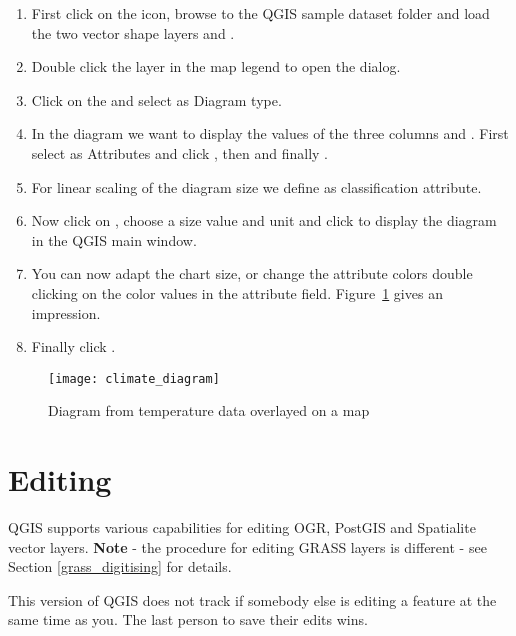 \begin{enumerate}
\item First click on the  icon,
browse to the QGIS sample dataset folder and load the two vector shape layers
 and .
\item Double click the  layer in the map legend to open the
 dialog.
\item Click on the  and select  as
Diagram type.
\item In the diagram we want to display the values of the three columns
 and . First select
 as Attributes and click , then
 and finally .  
\item For linear scaling of the diagram size we define 
as classification attribute.
\item Now click on , choose a size value and unit
and click  to display the diagram in the QGIS main window.
\item You can now adapt the chart size, or change the attribute colors double
clicking on the color values in the attribute field.
Figure~\ref{fig:climatediagram} gives an impression.
\item Finally click . 
\end{enumerate}

\begin{figure}[ht]
   \begin{center}
   \caption{Diagram from temperature data overlayed on a map \nixcaption}\label{fig:climatediagram}\smallskip
   \texttt{[image: climate\_diagram]}
\end{center}
\end{figure}

\section{Editing}

QGIS supports various capabilities for editing OGR, PostGIS and Spatialite 
vector layers. \textbf{Note} - the procedure for editing GRASS layers is 
different - see Section \ref{grass_digitising} for details.

\begin{Tip}[ht]\caption{\textsc{Concurrent Edits}}
This version of QGIS does not track if somebody else is editing a
feature at the same time as you. The last person to save their edits wins.
\end{Tip}

